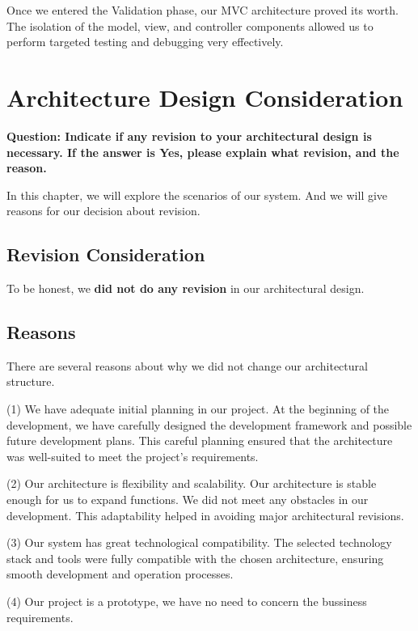 \documentclass[conference]{IEEEtran}
\begin{document}
Once we entered the Validation phase, our MVC architecture proved its worth. The isolation of the model, view, and controller components allowed us to perform targeted testing and debugging very effectively.



\section{\textbf{Architecture Design Consideration}}

\textbf{Question: Indicate if any revision to your architectural design is necessary. If the answer is Yes, please explain what revision, and the reason.}

In this chapter, we will explore the scenarios of our system. And we will give reasons for our decision about revision.

\subsection{\textbf{Revision Consideration}}

To be honest, we \textbf{did not do any revision} in our architectural design. 

\subsection{\textbf{Reasons}}

There are several reasons about why we did not change our architectural structure. 

(1) We have adequate initial planning in our project. At the beginning of the development, we have carefully designed the development framework and possible future development plans. This careful planning ensured that the architecture was well-suited to meet the project's requirements.

(2) Our architecture is flexibility and scalability. Our architecture is stable enough for us to expand functions. We did not meet any obstacles in our development. This adaptability helped in avoiding major architectural revisions.

(3) Our system has great technological compatibility. The selected technology stack and tools were fully compatible with the chosen architecture, ensuring smooth development and operation processes.

(4) Our project is a prototype, we have no need to concern the bussiness requirements. 
\end{document}
